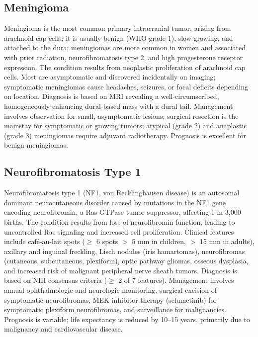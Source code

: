 \subsection{Meningioma}
\label{sec:Meningioma}
Meningioma is the most common primary intracranial tumor, arising from arachnoid cap cells; it is usually benign (WHO grade 1), slow-growing, and attached to the dura; meningiomas are more common in women and associated with prior radiation, neurofibromatosis type 2, and high progesterone receptor expression. The condition results from neoplastic proliferation of arachnoid cap cells. Most are asymptomatic and discovered incidentally on imaging; symptomatic meningiomas cause headaches, seizures, or focal deficits depending on location. Diagnosis is based on MRI revealing a well-circumscribed, homogeneously enhancing dural-based mass with a dural tail. Management involves observation for small, asymptomatic lesions; surgical resection is the mainstay for symptomatic or growing tumors; atypical (grade 2) and anaplastic (grade 3) meningiomas require adjuvant radiotherapy. Prognosis is excellent for benign meningiomas.

\subsection{Neurofibromatosis Type 1}
\label{sec:Neurofibromatosis Type 1}
Neurofibromatosis type 1 (NF1, von Recklinghausen disease) is an autosomal dominant neurocutaneous disorder caused by mutations in the NF1 gene encoding neurofibromin, a Ras-GTPase tumor suppressor, affecting 1 in 3,000 births. The condition results from loss of neurofibromin function, leading to uncontrolled Ras signaling and increased cell proliferation. Clinical features include caf\'{e}-au-lait spots ($\ge$ 6 spots $>$ 5 mm in children, $>$ 15 mm in adults), axillary and inguinal freckling, Lisch nodules (iris hamartomas), neurofibromas (cutaneous, subcutaneous, plexiform), optic pathway gliomas, osseous dysplasia, and increased risk of malignant peripheral nerve sheath tumors. Diagnosis is based on NIH consensus criteria ($\ge$ 2 of 7 features). Management involves annual ophthalmologic and neurologic monitoring, surgical excision of symptomatic neurofibromas, MEK inhibitor therapy (selumetinib) for symptomatic plexiform neurofibromas, and surveillance for malignancies. Prognosis is variable; life expectancy is reduced by 10--15 years, primarily due to malignancy and cardiovascular disease.

